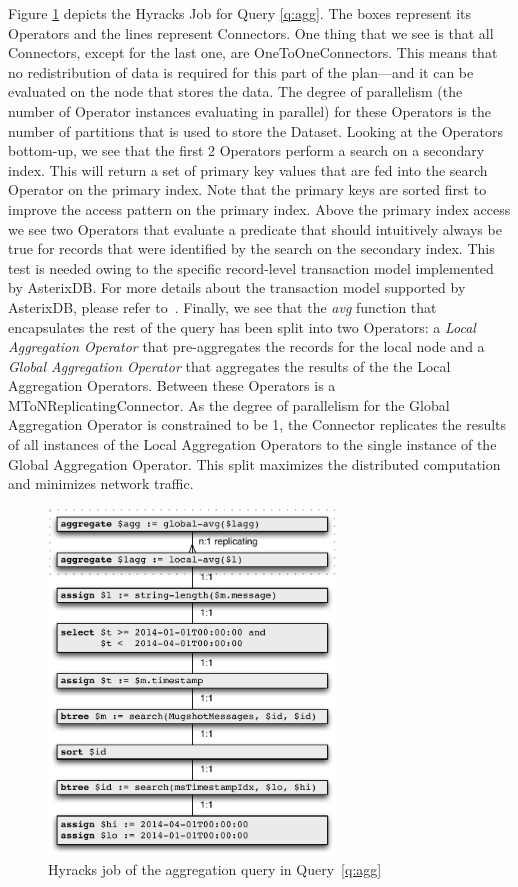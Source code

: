 Figure \ref{fig:job} depicts the Hyracks Job for Query \ref{q:agg}.
The boxes represent its Operators and the lines represent Connectors.
One thing that we see is that all Connectors, except for the last one, are OneToOneConnectors. 
This means that no redistribution of data is required for this part of the plan---and it can be evaluated on the node that stores the data.
The degree of parallelism (the number of Operator instances evaluating in parallel) for these Operators is the number of partitions that is used to store the Dataset.
Looking at the Operators bottom-up, we see that the first 2 Operators perform a search on a secondary index.
This will return a set of primary key values that are fed into the search Operator on the primary index.
Note that the primary keys are sorted first to improve the access pattern on the primary index.
Above the primary index access we see two Operators that evaluate a predicate that should intuitively always be true for records that were identified by the search on the secondary index. This test is needed owing to the specific record-level transaction model implemented by AsterixDB. For more details about the transaction model supported by AsterixDB, please refer to~\cite{ASTERIX}.
Finally, we see that the \emph{avg} function that encapsulates the rest of the query has been split into two Operators: a \emph{Local Aggregation Operator} that pre-aggregates the records for the local node and a \emph{Global Aggregation Operator} that aggregates the results of the the Local Aggregation Operators.
Between these Operators is a MToNReplicatingConnector.
As the degree of parallelism for the Global Aggregation Operator is constrained to be 1, the Connector replicates the results of all instances of the Local Aggregation Operators to the single instance of the Global Aggregation Operator.
This split maximizes the distributed computation and minimizes network traffic.

\begin{figure}[htb]
\centering
\includegraphics[width=3.0in]{images/hyracks-job2}
\caption{Hyracks job of the aggregation query in Query~\ref{q:agg}\label{fig:job}}
\end{figure}

